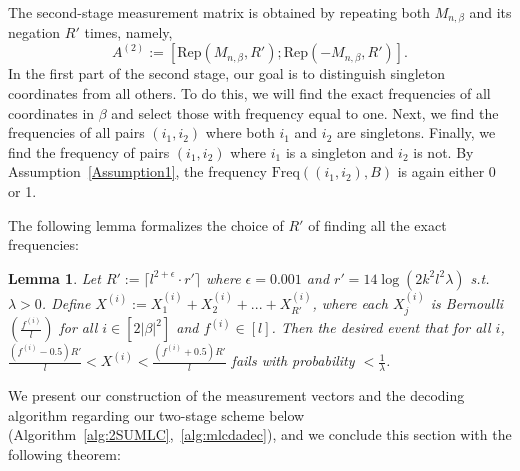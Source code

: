 \documentclass[10pt,a4paper]{amsart}
\newtheorem{lemma}{Lemma}[section]
\begin{document}
The second-stage measurement matrix is obtained by repeating both $M_{n,\beta}$ and its negation $R'$ times, namely,
\[
A^{(2)} := [\mathrm{Rep}(M_{n,\beta}, R');\mathrm{Rep}(-M_{n,\beta}, R')].
\]
In the first part of the second stage, our goal is to distinguish singleton coordinates from all others. To do this, we will find the exact frequencies of all coordinates in $\beta$ and select those with frequency equal to one. 
Next, we find the frequencies of all pairs $(i_1, i_2)$ where both $i_1$ and $i_2$ are singletons. 
Finally, we find the frequency of pairs $(i_1,i_2)$ where $i_1$ is a singleton and $i_2$ is not. By Assumption~\ref{Assumption1}, the frequency $\text{Freq}((i_1,i_2),B)$ is again either 0 or 1.

The following lemma formalizes the choice of $R'$ of finding all the exact frequencies: 

\begin{lemma}\label{lem:rep2}
    Let $R':=\lceil l^{2+\epsilon}\cdot r'\rceil$ where $\epsilon=0.001$ and $r'=14\log(2k^2l^2\lambda)$ s.t. $\lambda>0$. Define $X^{(i)}:=X_1^{(i)}+X_2^{(i)}+...+X_{R'}^{(i)}$, where each $X_j^{(i)}$ is Bernoulli $(\frac{f^{(i)}}{l})$ for all $i\in[2|\beta|^2]$ and $f^{(i)}\in[l]$. Then the desired event that for all $i$, $\frac{(f^{(i)}-0.5)R'}{l}<X^{(i)}<\frac{(f^{(i)}+0.5)R'}{l}$ fails with probability $<\frac{1}{\lambda}$. 
\end{lemma}
We present our construction of the measurement vectors and the decoding algorithm regarding our two-stage scheme below (Algorithm~\ref{alg:2SUMLC},~\ref{alg:mlcdadec}), and we conclude this section with the following theorem: 
\end{document}
